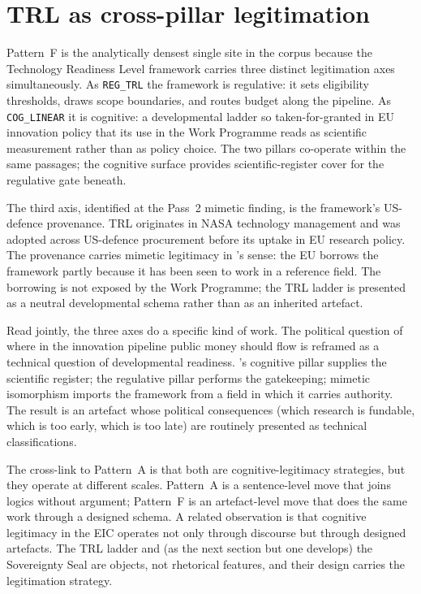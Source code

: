 \section{TRL as cross-pillar legitimation}
\label{sec:disc-trl}

Pattern~F is the analytically densest single site in the corpus
because the Technology Readiness Level framework carries three
distinct legitimation axes simultaneously. As \texttt{REG\_TRL} the
framework is regulative: it sets eligibility thresholds, draws scope
boundaries, and routes budget along the pipeline. As
\texttt{COG\_LINEAR} it is cognitive: a developmental ladder so
taken-for-granted in EU innovation policy that its use in the Work
Programme reads as scientific measurement rather than as policy
choice. The two pillars co-operate within the same passages; the
cognitive surface provides scientific-register cover for the
regulative gate beneath.

The third axis, identified at the Pass~2 mimetic finding, is the
framework's US-defence provenance. TRL originates in NASA technology
management and was adopted across US-defence procurement before its
uptake in EU research policy. The provenance carries mimetic
legitimacy in \textcite{dimaggio1983iron}'s sense: the EU borrows the
framework partly because it has been seen to work in a reference
field. The borrowing is not exposed by the Work Programme; the TRL
ladder is presented as a neutral developmental schema rather than as
an inherited artefact.

Read jointly, the three axes do a specific kind of work. The political
question of where in the innovation pipeline public money should flow
is reframed as a technical question of developmental readiness.
\textcite{scott2014institutions}'s cognitive pillar supplies the
scientific register; the regulative pillar performs the gatekeeping;
mimetic isomorphism imports the framework from a field in which it
carries authority. The result is an artefact whose political
consequences (which research is fundable, which is too early, which is
too late) are routinely presented as technical classifications.

The cross-link to Pattern~A is that both are cognitive-legitimacy
strategies, but they operate at different scales. Pattern~A is a
sentence-level move that joins logics without argument; Pattern~F is
an artefact-level move that does the same work through a designed
schema. A related observation is that cognitive legitimacy in the EIC
operates not only through discourse but through designed artefacts. The TRL ladder and (as the next section but one
develops) the Sovereignty Seal are objects, not rhetorical features,
and their design carries the legitimation strategy.

